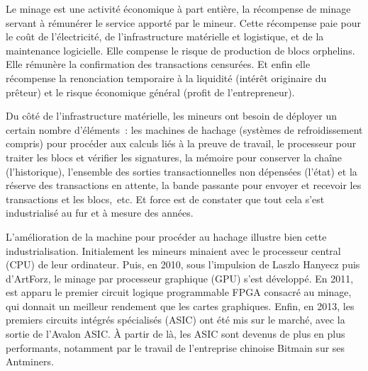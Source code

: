 Le minage est une activité économique à part entière, la récompense de minage servant à rémunérer le service apporté par le mineur. Cette récompense paie pour le coût de l'électricité, de l'infrastructure matérielle et logistique, et de la maintenance logicielle. Elle compense le risque de production de blocs orphelins. Elle rémunère la confirmation des transactions censurées. Et enfin elle récompense la renonciation temporaire à la liquidité (intérêt originaire du prêteur) et le risque économique général (profit de l'entrepreneur).

Du côté de l'infrastructure matérielle, les mineurs ont besoin de déployer un certain nombre d'éléments~: les machines de hachage (systèmes de refroidissement compris) pour procéder aux calculs liés à la preuve de travail, le processeur pour traiter les blocs et vérifier les signatures, la mémoire pour conserver la chaîne (l'historique), l'ensemble des sorties transactionnelles non dépensées (l'état) et la réserve des transactions en attente, la bande passante pour envoyer et recevoir les transactions et les blocs,~etc. Et force est de constater que tout cela s'est industrialisé au fur et à mesure des années.



L'amélioration de la machine pour procéder au hachage illustre bien cette industrialisation. Initialement les mineurs minaient avec le processeur central (CPU) de leur ordinateur. Puis, en 2010, sous l'impulsion de Laszlo Hanyecz puis d'ArtForz, le minage par processeur graphique (GPU) s'est développé. En 2011, est apparu le premier circuit logique programmable FPGA consacré au minage, qui donnait un meilleur rendement que les cartes graphiques. Enfin, en 2013, les premiers circuits intégrés spécialisés (ASIC) ont été mis sur le marché, avec la sortie de l'Avalon ASIC. À partir de là, les ASIC sont devenus de plus en plus performants, notamment par le travail de l'entreprise chinoise Bitmain sur ses Antminers.

